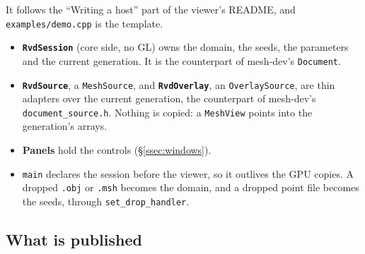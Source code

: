 \documentclass[11pt,a4paper]{article}
\newcommand{\code}[1]{\texttt{#1}}          %
\newcommand{\secref}[1]{\S\ref{#1}}
\begin{document}
It follows the ``Writing a host'' part of the viewer's README, and \code{examples/demo.cpp} is the
template.

\begin{itemize}
\item \textbf{\code{RvdSession}} (core side, no GL) owns the domain, the seeds, the parameters and
  the current generation. It is the counterpart of mesh-dev's \code{Document}.
\item \textbf{\code{RvdSource}}, a \code{MeshSource}, and \textbf{\code{RvdOverlay}}, an
  \code{OverlaySource}, are thin adapters over the current generation, the counterpart of mesh-dev's
  \code{document\_source.h}. Nothing is copied: a \code{MeshView} points into the generation's
  arrays.
\item \textbf{Panels} hold the controls (\secref{ssec:windows}).
\item \code{main} declares the session before the viewer, so it outlives the GPU copies. A dropped
  \code{.obj} or \code{.msh} becomes the domain, and a dropped point file becomes the seeds,
  through \code{set\_drop\_handler}.
\end{itemize}

\subsection{What is published}\label{ssec:published}
\end{document}
